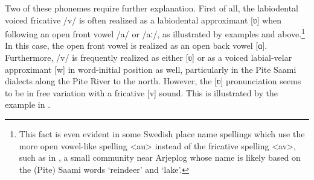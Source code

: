 Two of these phonemes require further explanation. First of all, the labiodental voiced fricative /v/ is often realized as a labiodental approximant [ʋ] when following an open front vowel /a/ or /aː/, as illustrated by examples  and  above.\footnote{This fact is even evident in some Swedish place name spellings which use the more open vowel-like spelling <au> instead of the fricative spelling <av>, such as in , a small community near Arjeplog whose name is likely based on the (Pite) Saami words  ‘reindeer’ and  ‘lake’.} %
In this case, the open front vowel is realized as an open back vowel [ɑ]. 
Furthermore, /v/ is frequently realized as either [ʋ] or as a voiced labial-velar approximant [w] in word-initial position as well, particularly in the Pite Saami dialects along the Pite River to the north. However, the [ʋ] pronunciation seems to be in free variation with a fricative [v] sound. 
This is illustrated by the example in .%
\ea\label{cheeseNOMSG}
\z

